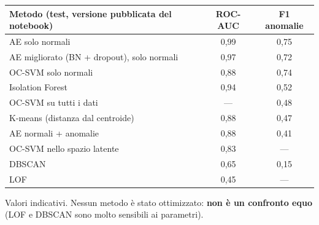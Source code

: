 \begin{center}
\small
\begin{tabular}{@{}lcc@{}}
\toprule
\textbf{Metodo (test, versione pubblicata del notebook)} & \textbf{ROC-AUC} & \textbf{F1 anomalie}\\
\midrule
AE solo normali & 0,99 & 0,75\\
AE migliorato (BN + dropout), solo normali & 0,97 & 0,72\\
OC-SVM solo normali & 0,88 & 0,74\\
Isolation Forest & 0,94 & 0,52\\
OC-SVM su tutti i dati & --- & 0,48\\
K-means (distanza dal centroide) & 0,88 & 0,47\\
AE normali + anomalie & 0,88 & 0,41\\
OC-SVM nello spazio latente & 0,83 & ---\\
DBSCAN & 0,65 & 0,15\\
LOF & 0,45 & ---\\
\bottomrule
\end{tabular}
\end{center}
Valori indicativi. Nessun metodo è stato ottimizzato: \textbf{non è un confronto equo} (LOF e DBSCAN sono molto sensibili ai parametri).

